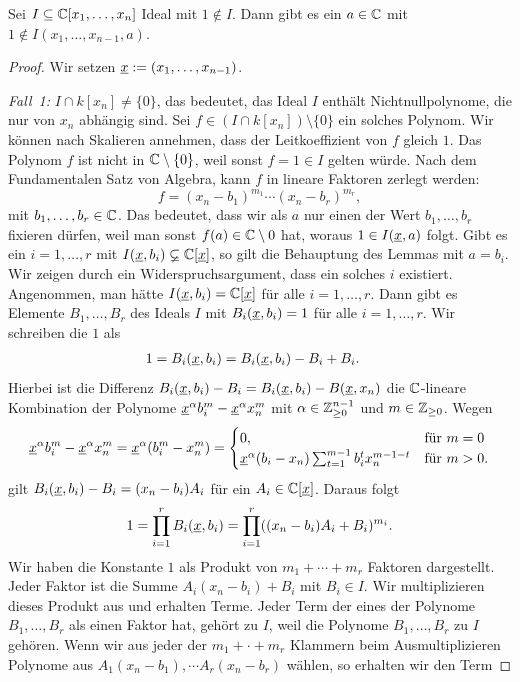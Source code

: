 \documentclass[11pt]{article}
\numberwithin{equation}{section}
\begin{document}
\begin{lemma} \label{lem:nullstellensatz}
	Sei $I \subseteq \mathbb{C}[x_1,\ldots,x_n]$ Ideal mit $1 \not \in I$. Dann gibt es ein $a \in \mathbb{C}$ mit $1 \not\in I(x_1,\ldots,x_{n-1},a)$. 
\end{lemma} 
\begin{proof} 
	Wir setzen $\underline{x} := (x_1,\ldots,x_{n-1})$. 
	
\emph{Fall~1:} $I \cap k[x_n] \ne \{0\}$, das bedeutet, das Ideal $I$ enthält Nichtnullpolynome, die nur von $x_n$ abhängig sind. Sei $f \in (I \cap k[x_n]) \setminus \{0\}$ ein solches Polynom. Wir können nach Skalieren annehmen, dass der Leitkoeffizient von $f$ gleich $1$. Das Polynom $f$ ist nicht in $\mathbb{C} \setminus \{0\}$, weil sonst $f = 1 \in I$ gelten würde. Nach dem  Fundamentalen Satz von Algebra,  kann $f$ in lineare Faktoren zerlegt werden: 
\[
f = (x_n - b_1)^{m_1} \cdots (x_n- b_r)^{m_r},
\]
mit $b_1,\ldots,b_r \in \mathbb{C}$. Das bedeutet, dass wir als $a$ nur einen der Wert $b_1,\ldots,b_r$ fixieren dürfen, weil man sonst $f(a) \in \mathbb{C} \setminus  0$ hat, woraus $1 \in I(\underline{x},a)$ folgt. Gibt es ein $i =1,\ldots, r$ mit $I(\underline{x},b_i)  \varsubsetneq \mathbb{C}[\underline{x}]$, so gilt die Behauptung des Lemmas mit  $a = b_i$. Wir zeigen durch ein Widerspruchsargument, dass ein solches $i$ existiert. Angenommen, man hätte $I(\underline{x}, b_i) = \mathbb{C}[\underline{x}]$ für alle $i=1,\ldots,r$. Dann gibt es Elemente $B_1,\ldots,B_r$ des Ideals $I$ mit $B_i(\underline{x},b_i) = 1$ für alle $i=1,\ldots,r$. Wir schreiben die $1$ als 
\begin{align*}
	1 & = B_i(\underline{x},b_i)  = B_i(\underline{x},b_i) - B_i + B_i.
\end{align*}
Hierbei ist die Differenz $B_i(\underline{x},b_i) - B_i = B_i(\underline{x},b_i) - B(\underline{x},x_n)$ die  $\mathbb{C}$-lineare Kombination der Polynome $\underline{x}^{\alpha} b_i^m - \underline{x}^\alpha x_n^m$ mit $\alpha \in \mathbb{Z}_{\ge 0}^{n-1}$ und $m \in \mathbb{Z}_{\ge 0}$.  Wegen \begin{align*}
	\underline{x}^{\alpha} b_i^m - \underline{x}^\alpha x_n^m = \underline{x}^{\alpha} (b_i^m - x_n^m) = \begin{cases} 0 , & \text{für} \ m=0 
			\\ \underline{x}^\alpha (b_i - x_n) \sum_{t=1}^{m-1} b_i^t x_n^{m-1-t} & \text{für} \ m >0.
	\end{cases} 
\end{align*}
gilt $B_i(\underline{x},b_i) - B_i =  (x_n -b_i) A_i$ für ein $A_i \in \mathbb{C}[\underline{x}]$.
Daraus folgt
\begin{align*}
	1  = \prod_{i=1}^r B_i(\underline{x},b_i)  = \prod_{i=1}^r ((x_n -b_i) A_i + B_i)^{m_i}. 
\end{align*}
Wir haben die Konstante $1$ als Produkt von $m_1 + \cdots + m_r$ Faktoren dargestellt. Jeder Faktor ist die Summe $A_i (x_n -b_i) + B_i$ mit $B_i \in I$. Wir multiplizieren dieses Produkt aus und erhalten Terme. Jeder Term der eines der Polynome $B_1,\ldots,B_r$ als einen Faktor hat, gehört zu $I$, weil die Polynome $B_1,\ldots,B_r$ zu $I$ gehören. Wenn wir aus jeder der $m_1+ \cdot + m_r$ Klammern beim Ausmultiplizieren Polynome aus $A_1 (x_n-b_1) ,\cdots A_r (x_n - b_r)$ wählen, so erhalten wir den Term 

\end{proof}
\end{document}
